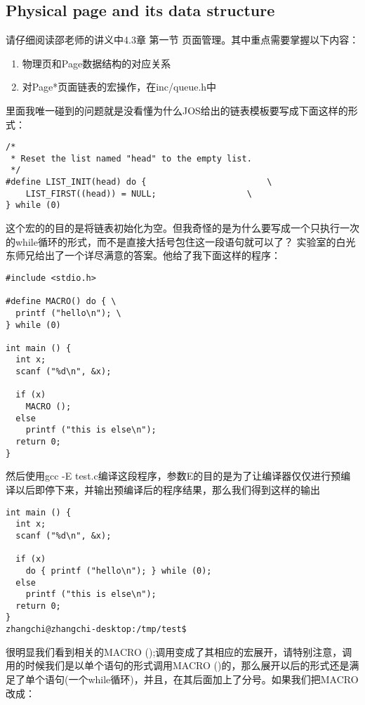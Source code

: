 \documentclass{article}
\newcommand{\funcname}[1]{{\ttfamily \small #1}}
\begin{document}
\begin{CJK*}{UTF8}{gkai}
\subsection{Physical page and its data structure}

请仔细阅读邵老师的讲义中4.3章 第一节 页面管理。其中重点需要掌握以下内容：

\begin{enumerate}
\item{物理页和Page数据结构的对应关系}
\item{对Page*页面链表的宏操作，在inc/queue.h中}
\end{enumerate}

里面我唯一碰到的问题就是没看懂为什么JOS给出的链表模板要写成下面这样的形式：

\begin{lstlisting}[style=ccode, firstnumber=165, title={\scriptsize \ttfamily \bfseries inc/queue.h}]
/*
 * Reset the list named "head" to the empty list.
 */
#define	LIST_INIT(head) do {						\
	LIST_FIRST((head)) = NULL;					\
} while (0)
\end{lstlisting}

这个宏的的目的是将链表初始化为空。但我奇怪的是为什么要写成一个只执行一次的while循环的形式，而不是直接大括号包住这一段语句就可以了？ 实验室的白光东师兄给出了一个详尽满意的答案。他给了我下面这样的程序：

\begin{lstlisting}[style=ccode, title={\scriptsize \ttfamily \bfseries test.c}]
#include <stdio.h>

#define MACRO() do { \
  printf ("hello\n"); \
} while (0)

int main () {
  int x;
  scanf ("%d\n", &x);

  if (x) 
    MACRO ();
  else
    printf ("this is else\n");
  return 0;
}
\end{lstlisting}

然后使用gcc -E test.c编译这段程序，参数E的目的是为了让编译器仅仅进行预编译以后即停下来，并输出预编译后的程序结果，那么我们得到这样的输出

\begin{lstlisting}[style=console]
int main () {
  int x;
  scanf ("%d\n", &x);

  if (x)
    do { printf ("hello\n"); } while (0);
  else
    printf ("this is else\n");
  return 0;
}
zhangchi@zhangchi-desktop:/tmp/test$ 
\end{lstlisting}

很明显我们看到相关的\funcname{MACRO ();}调用变成了其相应的宏展开，请特别注意，调用的时候我们是以单个语句的形式调用\funcname{MACRO ()}的，那么展开以后的形式还是满足了单个语句(一个while循环)，并且，在其后面加上了分号。如果我们把MACRO改成：


\end{CJK*}
\end{document}
